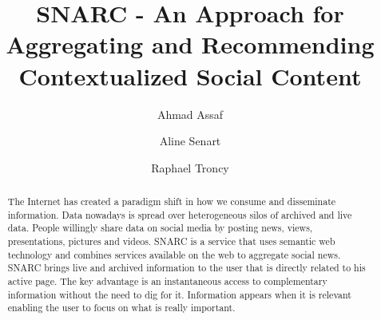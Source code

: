 \documentclass[oribibl]{llncs}
\begin{document}
\title{SNARC - An Approach for Aggregating and Recommending Contextualized Social Content}
\author{Ahmad Assaf \and Aline Senart \and Raphael Troncy}
\maketitle


\begin{abstract}
The Internet has created a paradigm shift in how we consume and disseminate information. Data nowadays is spread over heterogeneous silos of archived and live data. People willingly share data on social media by posting news, views, presentations, pictures and videos. SNARC is a service that uses semantic web technology and combines services available on the web to aggregate social news. SNARC brings live and archived information to the user that is directly related to his active page. The key advantage is an instantaneous access to complementary information without the need to dig for it. Information appears when it is relevant enabling the user to focus on what is really important.
\end{abstract}

\end{document}
